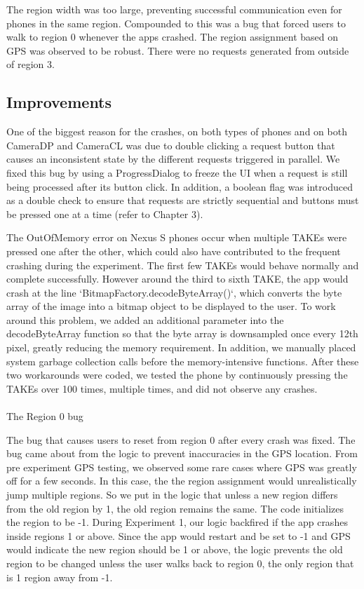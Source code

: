 The region width was too large, preventing successful communication even for phones in the same region. Compounded to this was a bug that forced users to walk to region 0 whenever the apps crashed. The region assignment based on GPS was observed to be robust. There were no requests generated from outside of region 3.

\subsection{Improvements}

One of the biggest reason for the crashes, on both types of phones and on both CameraDP and CameraCL was due to double clicking a request button that causes an inconsistent state by the different requests triggered in parallel. We fixed this bug by using a ProgressDialog to freeze the UI when a request is still being processed after its button click. In addition, a boolean flag was introduced as a double check to ensure that requests are strictly sequential and buttons must be pressed one at a time (refer to Chapter 3).

The OutOfMemory error on Nexus S phones occur when multiple TAKEs were pressed one after the other, which could also have contributed to the frequent crashing during the experiment. The first few TAKEs would behave normally and complete successfully. However around the third to sixth TAKE, the app would crash at the line `BitmapFactory.decodeByteArray()`, which converts the byte array of the image into a bitmap object to be displayed to the user.  To work around this problem, we added an additional parameter into the decodeByteArray function so that the byte array is downsampled once every 12th pixel, greatly reducing the memory requirement. In addition, we manually placed system garbage collection calls before the memory-intensive functions. After these two workarounds were coded, we tested the phone by continuously pressing the TAKEs over 100 times, multiple times, and did not observe any crashes.
\\
\\
The Region 0 bug

The bug that causes users to reset from region 0 after every crash was fixed. The bug came about from the logic to prevent inaccuracies in the GPS location. From pre experiment GPS testing, we observed some rare cases where GPS was greatly off for a few seconds. In this case, the the region assignment would unrealistically jump multiple regions. So we put in the logic that unless a new region differs from the old region by 1, the old region remains the same. The code initializes the region to be -1. During Experiment 1, our logic backfired if the app crashes inside regions 1 or above. Since the app would restart and be set to -1 and GPS would indicate the new region should be 1 or above, the logic prevents the old region to be changed unless the user walks back to region 0, the only region that is 1 region away from -1.

